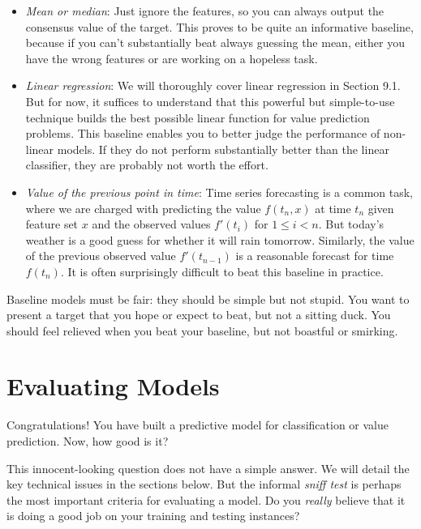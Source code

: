 \documentclass[10pt]{article}
\begin{document}
\begin{itemize}
  \item \textit{Mean or median}: Just ignore the features, so you can always output the consensus value of the target. This proves to be quite an informative baseline, because if you can’t substantially beat always guessing the mean, either you have the wrong features or are working on a hopeless task.
  
  \item \textit{Linear regression}: We will thoroughly cover linear regression in Section 9.1. But for now, it suffices to understand that this powerful but simple-to-use technique builds the best possible linear function for value prediction problems. This baseline enables you to better judge the performance of non-linear models. If they do not perform substantially better than the linear classifier, they are probably not worth the effort.
  
  \item \textit{Value of the previous point in time}: Time series forecasting is a common task, where we are charged with predicting the value \(f(t_{n}, x)\) at time \(t_{n}\) given feature set \(x\) and the observed values \(f'(t_{i})\) for \(1 \leq i < n\). But today’s weather is a good guess for whether it will rain tomorrow. Similarly, the value of the previous observed value \(f'(t_{n-1})\) is a reasonable forecast for time \(f(t_{n})\). It is often surprisingly difficult to beat this baseline in practice.
\end{itemize}

Baseline models must be fair: they should be simple but not stupid. You want to present a target that you hope or expect to beat, but not a sitting duck. You should feel relieved when you beat your baseline, but not boastful or smirking.

\section{Evaluating Models}

Congratulations! You have built a predictive model for classification or value prediction. Now, how good is it?

This innocent-looking question does not have a simple answer. We will detail the key technical issues in the sections below. But the informal \textit{sniff test} is perhaps the most important criteria for evaluating a model. Do you \textit{really} believe that it is doing a good job on your training and testing instances?
\end{document}
